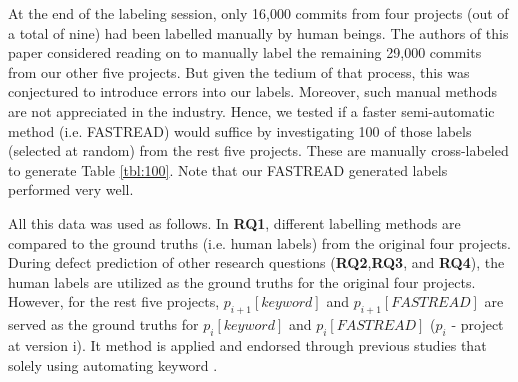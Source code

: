 \documentclass[10pt,journal,compsoc]{IEEEtran}
\begin{document}
At the end of the labeling session,
only 16,000 commits from  four projects (out of a total of nine) had been labelled manually by human beings. The authors
of this paper considered reading on to manually label the remaining 29,000 commits from our other
five projects. But given the tedium of that  process,
 this was conjectured to introduce errors into our 
labels. Moreover, such manual methods are not appreciated in the industry. Hence, we tested if a faster semi-automatic method (i.e. FASTREAD) would suffice by investigating 100 of those labels (selected at random) from the rest five projects. These are manually cross-labeled 
to generate Table \ref{tbl:100}.
Note that our FASTREAD generated labels  
performed very well.


 







All this data was used as follows. In {\bf RQ1}, different labelling methods are compared to 
the ground truths (i.e. human labels) from the original four projects. During defect prediction of other
research questions ({\bf RQ2},{\bf RQ3}, and {\bf RQ4}), the human labels are utilized as the ground truths for
the original four projects. However, for the rest five projects,  $p_{i+1}[keyword]$ and $p_{i+1}[FASTREAD]$ are served as the ground truths for $p_{i}[keyword]$ and $p_{i}[FASTREAD]$ ($p_i$ - project at version i). It method is applied and endorsed through previous studies that solely using automating keyword  \cite{nayrolles18_clever, commitguru, kamei12_jit, catolino17_jitmobile}. 
\end{document}
